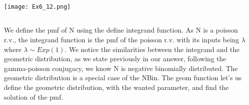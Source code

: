 \documentclass{article}
\begin{document}
\subsection{} %
\texttt{[image: Ex6\_12.png]}\\

\subsection{} %
We define the pmf of N using the define integrand function. As N is a poisson r.v., the integrand function is the pmf of the poisson r.v. with its inputs being $\lambda$ where $\lambda \sim Exp(1)$. We notice the similarities between the integrand and the geometric distribution, as we state previously in our answer, following the gamma-poisson conjugacy, we know N is negative binomially distributed. The geometric distribution is a special case of the NBin. The geom function let's us define the geometric distribution, with the wanted parameter, and find the solution of the pmf. 
\end{document}
